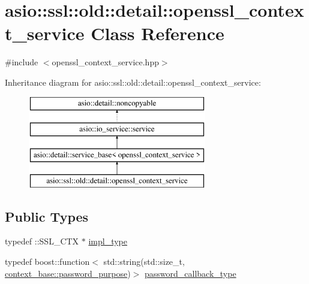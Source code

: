 \hypertarget{classasio_1_1ssl_1_1old_1_1detail_1_1openssl__context__service}{}\section{asio\+:\+:ssl\+:\+:old\+:\+:detail\+:\+:openssl\+\_\+context\+\_\+service Class Reference}
\label{classasio_1_1ssl_1_1old_1_1detail_1_1openssl__context__service}


{\ttfamily \#include $<$openssl\+\_\+context\+\_\+service.\+hpp$>$}

Inheritance diagram for asio\+:\+:ssl\+:\+:old\+:\+:detail\+:\+:openssl\+\_\+context\+\_\+service\+:\begin{figure}[H]
\begin{center}
\leavevmode
\includegraphics[height=4.000000cm]{classasio_1_1ssl_1_1old_1_1detail_1_1openssl__context__service}
\end{center}
\end{figure}
\subsection*{Public Types}
\begin{DoxyCompactItemize}
\item 
typedef \+::S\+S\+L\+\_\+\+C\+T\+X $\ast$ \hyperlink{classasio_1_1ssl_1_1old_1_1detail_1_1openssl__context__service_a1287914e0f48a9098c9141ca33ecd570}{impl\+\_\+type}
\item 
typedef boost\+::function$<$ std\+::string(std\+::size\+\_\+t, \hyperlink{classasio_1_1ssl_1_1context__base_a0e5aec1cd0f3db28becde1dca686c855}{context\+\_\+base\+::password\+\_\+purpose})$>$ \hyperlink{classasio_1_1ssl_1_1old_1_1detail_1_1openssl__context__service_aca3250c5d335efd54d1b3b7a49ed22a8}{password\+\_\+callback\+\_\+type}
\end{DoxyCompactItemize}
